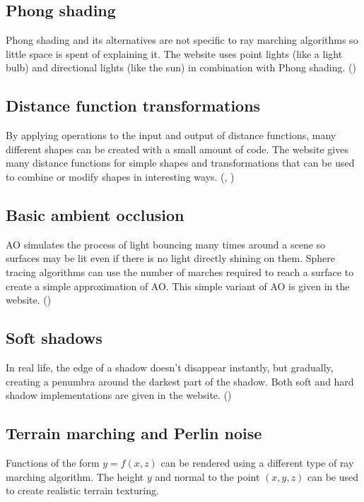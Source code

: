 \documentclass[parskip=half]{scrartcl}
\begin{document}
\subsection{Phong shading}

Phong shading and its alternatives are not specific to ray marching algorithms
so little space is spent of explaining it. The website uses point lights (like
a light bulb) and directional lights (like the sun) in combination with Phong
shading. ()

\subsection{Distance function transformations}

By applying operations to the input and output of distance functions, many
different shapes can be created with a small amount of code. The website gives
many distance functions for simple shapes and transformations that can be used
to combine or modify shapes in interesting ways. (,
)

\subsection{Basic ambient occlusion}

AO simulates the process of light bouncing many times around a scene so
surfaces may be lit even if there is no light directly shining on them. Sphere
tracing algorithms can use the number of marches required to reach a surface to
create a simple approximation of AO. This simple variant of AO is given in the
website. ()

\subsection{Soft shadows}

In real life, the edge of a shadow doesn't disappear instantly, but gradually,
creating a penumbra around the darkest part of the shadow. Both soft and hard
shadow implementations are given in the website. ()

\subsection{Terrain marching and Perlin noise}

Functions of the form $y=f(x,z)$ can be rendered using a different type of ray
marching algorithm. The height $y$ and normal to the point $(x,y,z)$ can be
used to create realistic terrain texturing.
\end{document}
